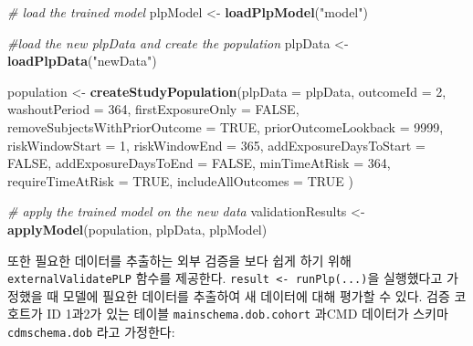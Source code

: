 \documentclass[10.5pt]{book}
\newenvironment{Shaded}{\begin{snugshade}}{\end{snugshade}}
\newcommand{\KeywordTok}[1]{\textcolor[rgb]{0.13,0.29,0.53}{\textbf{#1}}}
\newcommand{\DataTypeTok}[1]{\textcolor[rgb]{0.13,0.29,0.53}{#1}}
\newcommand{\DecValTok}[1]{\textcolor[rgb]{0.00,0.00,0.81}{#1}}
\newcommand{\StringTok}[1]{\textcolor[rgb]{0.31,0.60,0.02}{#1}}
\newcommand{\CommentTok}[1]{\textcolor[rgb]{0.56,0.35,0.01}{\textit{#1}}}
\newcommand{\OtherTok}[1]{\textcolor[rgb]{0.56,0.35,0.01}{#1}}
\newcommand{\NormalTok}[1]{#1}
\theoremstyle{definition}
\theoremstyle{definition}
\theoremstyle{definition}
\theoremstyle{remark}
\begin{document}
\begin{Shaded}
\begin{Highlighting}[]
\CommentTok{# load the trained model}
\NormalTok{plpModel <-}\StringTok{ }\KeywordTok{loadPlpModel}\NormalTok{(}\StringTok{"model"}\NormalTok{)}

\CommentTok{#load the new plpData and create the population}
\NormalTok{plpData <-}\StringTok{ }\KeywordTok{loadPlpData}\NormalTok{(}\StringTok{"newData"}\NormalTok{)}

\NormalTok{population <-}\StringTok{ }\KeywordTok{createStudyPopulation}\NormalTok{(}\DataTypeTok{plpData =}\NormalTok{ plpData,}
                                    \DataTypeTok{outcomeId =} \DecValTok{2}\NormalTok{,}
                                    \DataTypeTok{washoutPeriod =} \DecValTok{364}\NormalTok{,}
                                    \DataTypeTok{firstExposureOnly =} \OtherTok{FALSE}\NormalTok{,}
                                    \DataTypeTok{removeSubjectsWithPriorOutcome =} \OtherTok{TRUE}\NormalTok{,}
                                    \DataTypeTok{priorOutcomeLookback =} \DecValTok{9999}\NormalTok{,}
                                    \DataTypeTok{riskWindowStart =} \DecValTok{1}\NormalTok{,}
                                    \DataTypeTok{riskWindowEnd =} \DecValTok{365}\NormalTok{,}
                                    \DataTypeTok{addExposureDaysToStart =} \OtherTok{FALSE}\NormalTok{,}
                                    \DataTypeTok{addExposureDaysToEnd =} \OtherTok{FALSE}\NormalTok{,}
                                    \DataTypeTok{minTimeAtRisk =} \DecValTok{364}\NormalTok{,}
                                    \DataTypeTok{requireTimeAtRisk =} \OtherTok{TRUE}\NormalTok{,}
                                    \DataTypeTok{includeAllOutcomes =} \OtherTok{TRUE}
\NormalTok{)}

\CommentTok{# apply the trained model on the new data}
\NormalTok{validationResults <-}\StringTok{ }\KeywordTok{applyModel}\NormalTok{(population, plpData, plpModel)}
\end{Highlighting}
\end{Shaded}

또한 필요한 데이터를 추출하는 외부 검증을 보다 쉽게 하기 위해
\texttt{externalValidatePLP} 함수를 제공한다.
\texttt{result\ \textless{}-\ runPlp(...)}을 실행했다고 가정했을 때
모델에 필요한 데이터를 추출하여 새 데이터에 대해 평가할 수 있다. 검증
코호트가 ID 1과2가 있는 테이블 \texttt{mainschema.dob.cohort} 과CMD
데이터가 스키마 \texttt{cdmschema.dob} 라고 가정한다:
\end{document}
